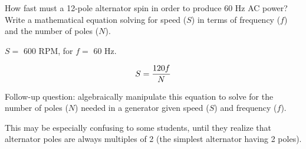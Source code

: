 

How fast must a 12-pole alternator spin in order to produce 60 Hz AC power?  Write a mathematical equation solving for speed ($S$) in terms of frequency ($f$) and the number of poles ($N$).







$S =$ 600 RPM, for $f =$ 60 Hz.

$$S = {{120 f} \over N}$$

\vskip 10pt

Follow-up question: algebraically manipulate this equation to solve for the number of poles ($N$) needed in a generator given speed ($S$) and frequency ($f$).







This may be especially confusing to some students, until they realize that alternator poles are always multiples of 2 (the simplest alternator having 2 poles).





